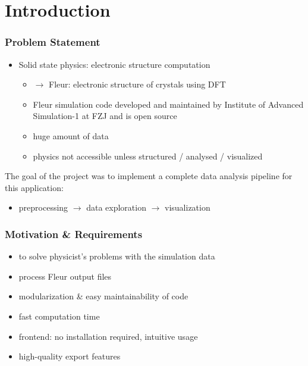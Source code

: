 

%
\section{Introduction}
\label{sec:introduction}




\begin{frame}\frametitle{Problem Statement}
\begin{itemize}
\item Solid state physics: electronic structure computation
\begin{itemize}
\item \(\rightarrow\) Fleur: electronic structure of crystals using DFT
\item Fleur simulation code developed and maintained by Institute of Advanced Simulation-1 at FZJ and is open source
\item huge amount of data
\item physics not accessible unless structured / analysed / visualized
\end{itemize}
\end{itemize}
The goal of the project was to implement a complete data analysis pipeline for this application:
\begin{itemize}
\item preprocessing \(\rightarrow\) data exploration \(\rightarrow\) visualization
\end{itemize}
\end{frame}

\begin{frame}\frametitle{Motivation \& Requirements}
\begin{itemize}
\item to solve physicist's problems with the simulation data
\item process Fleur output files
\item modularization \& easy maintainability of code
\item fast computation time
\item frontend: no installation required, intuitive usage
\item high-quality export features
\end{itemize}
\end{frame}

